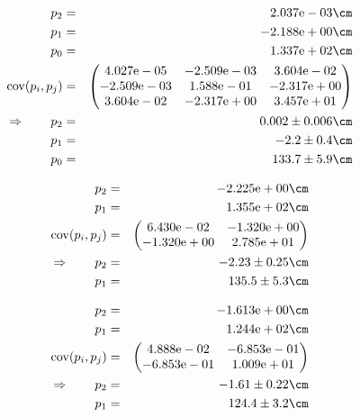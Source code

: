 \begin{eqnarray}
    p_2 &=& 2.037\mathrm{e}-03 \cm \nonumber \\
    p_1 &=& -2.188\mathrm{e}+00 \cm \nonumber \\
    p_0 &=& 1.337\mathrm{e}+02 \cm \nonumber \\
    \mathrm{cov}(p_i, p_j) &=& 
    \begin{pmatrix}
        4.027\mathrm{e}-05 &-2.509\mathrm{e}-03 &3.604\mathrm{e}-02 \\
        -2.509\mathrm{e}-03 &1.588\mathrm{e}-01 &-2.317\mathrm{e}+00 \\
        3.604\mathrm{e}-02 &-2.317\mathrm{e}+00 &3.457\mathrm{e}+01 \\
    \end{pmatrix}
\\ \Rightarrow \qquad
    p_2 &=& 0.002 \pm 0.006 \cm\\
    p_1 &=& -2.2 \pm 0.4 \cm\\
    p_0 &=& 133.7 \pm 5.9 \cm
\end{eqnarray}

\begin{eqnarray}
    p_2 &=& -2.225\mathrm{e}+00 \cm \nonumber \\
    p_1 &=& 1.355\mathrm{e}+02 \cm \nonumber \\
    \mathrm{cov}(p_i, p_j) &=& 
    \begin{pmatrix}
        6.430\mathrm{e}-02 &-1.320\mathrm{e}+00 \\
        -1.320\mathrm{e}+00 &2.785\mathrm{e}+01 \\
    \end{pmatrix}
\\ \Rightarrow \qquad
    p_2 &=& -2.23 \pm 0.25 \cm\\
    p_1 &=& 135.5 \pm 5.3 \cm
\end{eqnarray}

\begin{eqnarray}
    p_2 &=& -1.613\mathrm{e}+00 \cm \nonumber \\
    p_1 &=& 1.244\mathrm{e}+02 \cm \nonumber \\
    \mathrm{cov}(p_i, p_j) &=& 
    \begin{pmatrix}
        4.888\mathrm{e}-02 &-6.853\mathrm{e}-01 \\
        -6.853\mathrm{e}-01 &1.009\mathrm{e}+01 \\
    \end{pmatrix}
\\ \Rightarrow \qquad
    p_2 &=& -1.61 \pm 0.22 \cm\\
    p_1 &=& 124.4 \pm 3.2 \cm
\end{eqnarray}

